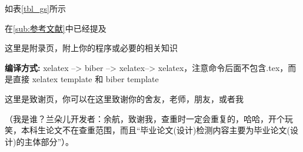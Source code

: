 \documentclass[AutoFakeBold]{LZUThesis}
\begin{document}
如表\ref{tbl_gs}所示

在\ref{sub:参考文献}中已经提及

% 

\backmatter


\printbib



\Appendix


这里是附录页，附上你的程序或必要的相关知识

{\bfseries 编译方式:} xelatex --> biber --> xelatex--> xelatex，注意命令后面不包含.tex，而是直接 xelatex template 和 biber template

\Thanks

这里是致谢页，你可以在这里致谢你的舍友，老师，朋友，或者我

（我是谁？兰朵儿开发者：余航，致谢我，查重时一定会重复的，哈哈，开个玩笑，本科生论文不在查重范围，而且“毕业论文(设计)检测内容主要为毕业论文(设计)的主体部分”）。


\Grade %
\end{document}
